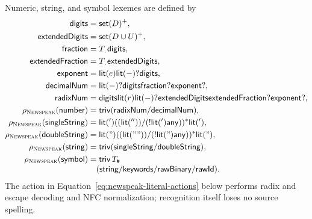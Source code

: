 Numeric, string, and symbol lexemes are defined by
\begin{equation}\label{eq:newspeak-literal-peg}
\begin{aligned}
 \mathsf{digits}&=\mathsf{set}(D)^+,\\
 \mathsf{extendedDigits}&=\mathsf{set}(D\cup U)^+,\\
 \mathsf{fraction}&=T_{\texttt{.}}\mathsf{digits},\\
 \mathsf{extendedFraction}&=T_{\texttt{.}}\mathsf{extendedDigits},\\
 \mathsf{exponent}&=\mathsf{lit}(e)\mathsf{lit}(-)?\mathsf{digits},\\
 \mathsf{decimalNum}&=\mathsf{lit}(-)?\mathsf{digits}
       \mathsf{fraction}?\mathsf{exponent}?,\\
 \mathsf{radixNum}&=\mathsf{digits}\mathsf{lit}(r)\mathsf{lit}(-)?
       \mathsf{extendedDigits}\mathsf{extendedFraction}?
       \mathsf{exponent}?,\\
 \rho_{\textsc{Newspeak}}(\mathsf{number})&=\mathsf{triv}
       (\mathsf{radixNum}/\mathsf{decimalNum}),\\
 \rho_{\textsc{Newspeak}}(\mathsf{singleString})&=
   \mathsf{lit}(' )((\mathsf{lit}(''))/(!\mathsf{lit}(' )\mathsf{any}))^*\mathsf{lit}(' ),\\
 \rho_{\textsc{Newspeak}}(\mathsf{doubleString})&=
   \mathsf{lit}(")((\mathsf{lit}(""))/(!\mathsf{lit}(")\mathsf{any}))^*\mathsf{lit}("),\\
 \rho_{\textsc{Newspeak}}(\mathsf{string})&=\mathsf{triv}
   (\mathsf{singleString}/\mathsf{doubleString}),\\
 \rho_{\textsc{Newspeak}}(\mathsf{symbol})&=\mathsf{triv}\,T_{\texttt{\#}}\\[-1mm]
  &\quad(\mathsf{string}/\mathsf{keywords}/
          \mathsf{rawBinary}/\mathsf{rawId}).
\end{aligned}
\end{equation}
The action in Equation~\eqref{eq:newspeak-literal-actions} below performs radix
and escape decoding and NFC normalization; recognition itself loses no source
spelling.

